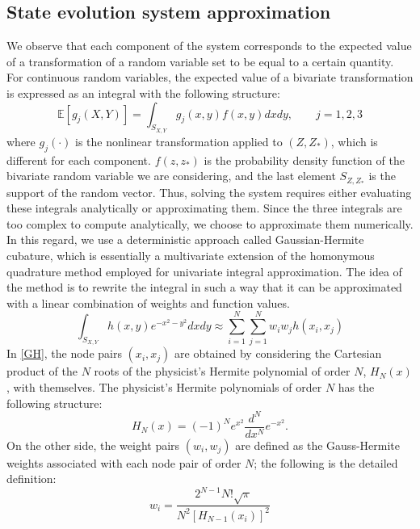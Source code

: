 \documentclass{article}
\begin{document}
\subsection{State evolution system approximation}
We observe that each component of the system corresponds to the expected value of a transformation of a random variable set to be equal to a certain quantity. For continuous random variables, the expected value of a bivariate transformation is expressed as an integral with the following structure: 
\begin{equation}
\mathbb{E}[g_j(X,Y)]=\int_{S_{X,Y}}g_j(x,y)f(x,y)dxdy,\qquad j=1,2,3
\label{expval}
\end{equation}
where $g_j(\cdot)$ is the nonlinear transformation applied to $(Z,Z_*)$, which is different for each component. $f(z,z_*)$ is the probability density function of the bivariate random variable we are considering, and the last element $S_{Z,Z_*}$ is the support of the random vector.
Thus, solving the system requires either evaluating these integrals analytically or approximating them. Since the three integrals are too complex to compute analytically, we choose to approximate them numerically. In this regard, we use a deterministic approach called Gaussian-Hermite cubature, which is essentially a multivariate extension of the homonymous quadrature method employed for univariate integral approximation. The idea of the method is to rewrite the integral in such a way that it can be approximated with a linear combination of weights and function values.
\begin{equation}
\int_{S_{X,Y}} h(x,y)e^{-x^2-y^2}dxdy\approx\overset{N}{\underset{i=1}{\sum}}\overset{N}{\underset{j=1}{\sum}}w_iw_jh(x_i,x_j)
\label{GH}
\end{equation}
In \eqref{GH}, the node pairs $(x_i,x_j)$ are obtained by considering the Cartesian product of the $N$ roots of the physicist's Hermite polynomial of order $N$, $H_N(x)$, with themselves. The physicist's Hermite polynomials of order $N$ has the following structure:
\begin{equation*}
H_N(x)=(-1)^Ne^{x^2}\frac{d^N}{dx^N}e^{-x^2}.
\end{equation*}
On the other side, the weight pairs $(w_i,w_j)$ are defined as the Gauss-Hermite weights associated with each node pair of order $N$; the following is the detailed definition:
\begin{equation*}
w_i=\frac{2^{N-1}N!\sqrt{\pi}}{N^2[H_{N-1}(x_i)]^2}
\end{equation*}
\end{document}

